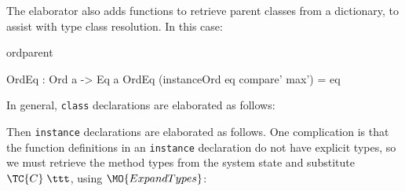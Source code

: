 
\noindent
The elaborator also adds functions to retrieve parent classes from a dictionary, to assist
with type class resolution. In this case:

\begin{SaveVerbatim}{ordparent}

OrdEq : Ord a -> Eq a
OrdEq (instanceOrd {{eq}} compare' max') = eq

\end{SaveVerbatim}

\noindent
In general, \texttt{class} declarations are elaborated as follows:


\noindent
Then \texttt{instance} declarations are elaborated as follows. One complication
is that the function definitions in an \texttt{instance} declaration do not
have explicit types, so we must retrieve the method types from the system state
and substitute $\TC{C}\;\ttt$, using $\MO{ExpandTypes}$:


